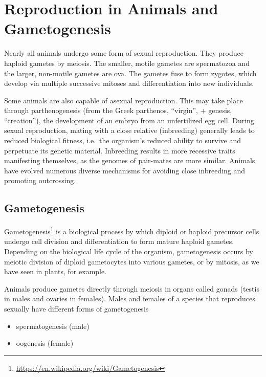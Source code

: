 \documentclass[]{book}
\providecommand{\tightlist}{%
  \setlength{\itemsep}{0pt}\setlength{\parskip}{0pt}}
\let\rmarkdownfootnote\footnote%
\def\footnote{\protect\rmarkdownfootnote}
\renewcommand{\href}[2]{#2\footnote{\url{#1}}}
\begin{document}
\hypertarget{reproduction-in-animals-and-gametogenesis}{%
\chapter{Reproduction in Animals and Gametogenesis}\label{reproduction-in-animals-and-gametogenesis}}

Nearly all animals undergo some form of sexual reproduction. They produce haploid gametes by meiosis. The smaller, motile gametes are spermatozoa and the larger, non-motile gametes are ova. The gametes fuse to form zygotes, which develop via multiple successive mitoses and differentiation into new individuals.

Some animals are also capable of asexual reproduction. This may take place through parthenogenesis (from the Greek parthenos, ``virgin'', + genesis, ``creation''), the development of an embryo from an unfertilized egg cell. During sexual reproduction, mating with a close relative (inbreeding) generally leads to reduced biological fitness, i.e.~the organism's reduced ability to survive and perpetuate its genetic material. Inbreeding results in more recessive traits manifesting themselves, as the genomes of pair-mates are more similar. Animals have evolved numerous diverse mechanisms for avoiding close inbreeding and promoting outcrossing.

\hypertarget{gametogenesis}{%
\section{Gametogenesis}\label{gametogenesis}}

\href{https://en.wikipedia.org/wiki/Gametogenesis}{Gametogenesis} is a biological process by which diploid or haploid precursor cells undergo cell division and differentiation to form mature haploid gametes. Depending on the biological life cycle of the organism, gametogenesis occurs by meiotic division of diploid gametocytes into various gametes, or by mitosis, as we have seen in plants, for example.

Animals produce gametes directly through meiosis in organs called gonads (testis in males and ovaries in females). Males and females of a species that reproduces sexually have different forms of gametogenesis

\begin{itemize}
\tightlist
\item
  spermatogenesis (male)
\item
  oogenesis (female)
\end{itemize}
\end{document}

